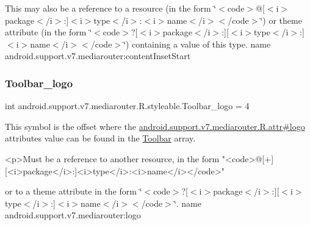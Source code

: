 This may also be a reference to a resource (in the form \char`\"{}$<$code$>$@\mbox{[}$<$i$>$package$<$/i$>$\+:\mbox{]}$<$i$>$type$<$/i$>$\+:$<$i$>$name$<$/i$>$$<$/code$>$\char`\"{}) or theme attribute (in the form \char`\"{}$<$code$>$?\mbox{[}$<$i$>$package$<$/i$>$\+:\mbox{]}\mbox{[}$<$i$>$type$<$/i$>$\+:\mbox{]}$<$i$>$name$<$/i$>$$<$/code$>$\char`\"{}) containing a value of this type.  name android.\+support.\+v7.\+mediarouter\+:content\+Inset\+Start \mbox{\label{classandroid_1_1support_1_1v7_1_1mediarouter_1_1R_1_1styleable_ab965f1cf2cb8e80419699e46c728bc5e}} 
\subsubsection{\texorpdfstring{Toolbar\+\_\+logo}{Toolbar\_logo}}
{\footnotesize\ttfamily int android.\+support.\+v7.\+mediarouter.\+R.\+styleable.\+Toolbar\+\_\+logo = 4\hspace{0.3cm}{\ttfamily [static]}}

This symbol is the offset where the \hyperlink{classandroid_1_1support_1_1v7_1_1mediarouter_1_1R_1_1attr_a822b5539967874c6df4234b52a556c30}{android.\+support.\+v7.\+mediarouter.\+R.\+attr\#logo} attribute\textquotesingle{}s value can be found in the \hyperlink{classandroid_1_1support_1_1v7_1_1mediarouter_1_1R_1_1styleable_a6815cdfaadde30c82b955863af196899}{Toolbar} array.

\begin{DoxyVerb}      <p>Must be a reference to another resource, in the form "<code>@[+][<i>package</i>:]<i>type</i>:<i>name</i></code>"
\end{DoxyVerb}
 or to a theme attribute in the form \char`\"{}$<$code$>$?\mbox{[}$<$i$>$package$<$/i$>$\+:\mbox{]}\mbox{[}$<$i$>$type$<$/i$>$\+:\mbox{]}$<$i$>$name$<$/i$>$$<$/code$>$\char`\"{}.  name android.\+support.\+v7.\+mediarouter\+:logo \mbox{\label{classandroid_1_1support_1_1v7_1_1mediarouter_1_1R_1_1styleable_aa07c1902f3672989051d9bdae17e9fae}} 
